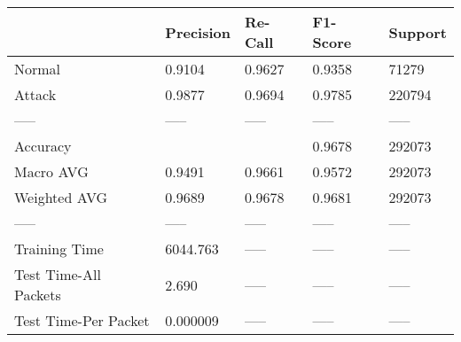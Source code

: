 \begin{tabular}{lllll}
\toprule
{} & Precision & Re-Call & F1-Score & Support \\
\midrule
Normal                &    0.9104 &  0.9627 &   0.9358 &   71279 \\
Attack                &    0.9877 &  0.9694 &   0.9785 &  220794 \\
-----                 &     ----- &   ----- &    ----- &   ----- \\
Accuracy              &           &         &   0.9678 &  292073 \\
Macro AVG             &    0.9491 &  0.9661 &   0.9572 &  292073 \\
Weighted AVG          &    0.9689 &  0.9678 &   0.9681 &  292073 \\
-----                 &     ----- &   ----- &    ----- &   ----- \\
Training Time         &  6044.763 &   ----- &    ----- &   ----- \\
Test Time-All Packets &     2.690 &   ----- &    ----- &   ----- \\
Test Time-Per Packet  &  0.000009 &   ----- &    ----- &   ----- \\
\bottomrule
\end{tabular}
